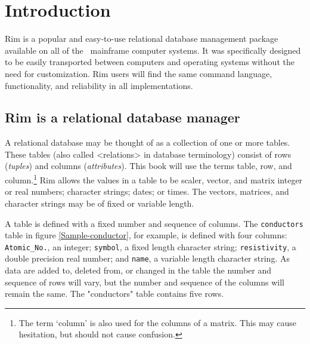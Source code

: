 \documentclass[11pt,a4paper]{report}
\begin{document}
%
%
\chapter{Introduction}
 
Rim is a popular and easy-to-use
relational database management package available
on all of the \UCS\ mainframe computer systems.
It was specifically designed to be easily transported between
computers and operating systems without the need for
customization.  Rim users will find the same command language,
functionality, and reliability in all implementations.
 
 
\section{Rim is a relational database manager}
A relational database may be thought of as a collection of
one or more tables.  These tables (also called <relations> in
database terminology) consist of rows (\emph{tuples}) and
columns (\emph{attributes}).
This book will use the terms table,
row, and column.\footnote{The term `column' is also used for
the columns of a matrix.  This may cause hesitation, but
should not cause confusion.}
Rim allows the values in a table to be
scaler, vector, and matrix integer or real numbers;
character strings; dates; or times.
The vectors, matrices, and character strings may be of fixed
or variable length.
 
A table is defined with a fixed number and sequence
of columns.  The \verb|conductors| table in
figure \ref{Sample-conductor}, for example,
is defined with four columns: \verb|Atomic_No.|, an integer;
\verb|symbol|, a fixed length character string;
\verb|resistivity|, a double precision real number;
and \verb|name|, a variable length character string.
As data are added to, deleted from, or changed in the
table the number and sequence of rows will vary, but
the number and sequence of the columns will remain the same.
The "conductors" table contains five rows.
 
\end{document}
